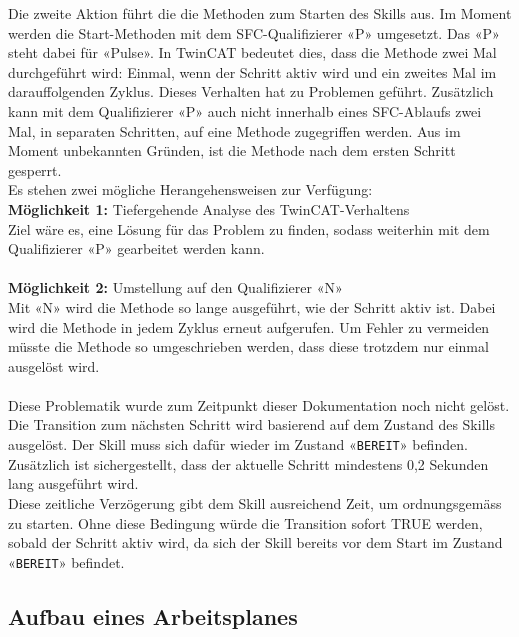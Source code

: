 		Die zweite Aktion führt die die Methoden zum Starten des Skills aus. Im Moment werden die Start-Methoden mit dem \Gls{SFC}-Qualifizierer «P» umgesetzt.  Das «P» steht dabei für «Pulse». In TwinCAT bedeutet dies, dass die Methode zwei Mal durchgeführt wird: Einmal, wenn der Schritt aktiv wird und ein zweites Mal im darauffolgenden Zyklus. Dieses Verhalten hat zu Problemen geführt. Zusätzlich kann mit dem Qualifizierer «P» auch nicht innerhalb eines \Gls{SFC}-Ablaufs zwei Mal, in separaten Schritten, auf eine Methode zugegriffen werden. Aus im Moment unbekannten Gründen, ist die Methode nach dem ersten Schritt gesperrt. 
		\vspace{2mm} 
		\\
		Es stehen zwei mögliche Herangehensweisen zur Verfügung:
		\vspace{2mm} 
		\\
		\textbf{Möglichkeit 1: } Tiefergehende Analyse des TwinCAT-Verhaltens
		\vspace{2mm} 
		\\
		Ziel wäre es, eine Lösung für das Problem zu finden, sodass weiterhin mit dem Qualifizierer «P» gearbeitet werden kann.
		\\
		\\
		\textbf{Möglichkeit 2: } Umstellung auf den Qualifizierer «N»
		\vspace{2mm} 
		\\
		Mit «N» wird die Methode so lange ausgeführt, wie der Schritt aktiv ist. Dabei wird die Methode in jedem Zyklus erneut aufgerufen. Um Fehler zu vermeiden müsste die Methode so umgeschrieben werden, dass diese trotzdem nur einmal ausgelöst wird.
		\\
		\\
		Diese Problematik wurde zum Zeitpunkt dieser Dokumentation noch nicht gelöst.
		\\
		Die Transition zum nächsten Schritt wird basierend auf dem Zustand des Skills ausgelöst. Der Skill muss sich dafür wieder im Zustand «\verb|BEREIT|» befinden. Zusätzlich ist sichergestellt, dass der aktuelle Schritt mindestens 0,2 Sekunden lang ausgeführt wird.
		\\
		Diese zeitliche Verzögerung gibt dem Skill ausreichend Zeit, um ordnungsgemäss zu starten. Ohne diese Bedingung würde die Transition sofort TRUE werden, sobald der Schritt aktiv wird, da sich der Skill bereits vor dem Start im Zustand «\verb|BEREIT|» befindet.
		
		\newpage
		
	\subsection{Aufbau eines Arbeitsplanes} \label{Prozessmodell_Arbeitsplanaufbau}
		

